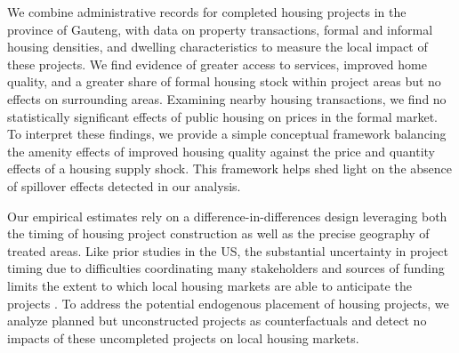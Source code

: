 \documentclass[12pt]{article}
\begin{document}
We combine administrative records for completed housing projects in the province of Gauteng, with data on property transactions, formal and informal housing densities, and dwelling characteristics to measure the local impact of these projects.   We find evidence of greater access to services, improved home quality, and a greater share of formal housing stock within project areas but no effects on surrounding areas.  Examining nearby housing transactions, we find no statistically significant effects of public housing on prices in the formal market.  To interpret these findings, we provide a simple conceptual framework balancing the amenity effects of improved housing quality against the price and quantity effects of a housing supply shock.  This framework helps shed light on the absence of spillover effects detected in our analysis.

Our empirical estimates rely on a difference-in-differences design leveraging both the timing of housing project construction as well as the precise geography of treated areas. Like prior studies in the US, the substantial uncertainty in project timing due to difficulties coordinating many stakeholders and sources of funding limits the extent to which local housing markets are able to anticipate the projects \citep{diamond2016wants, serihistory}.  To address the potential endogenous placement of housing projects, we analyze planned but unconstructed projects as counterfactuals and detect no impacts of these uncompleted projects on local housing markets.

\end{document}
